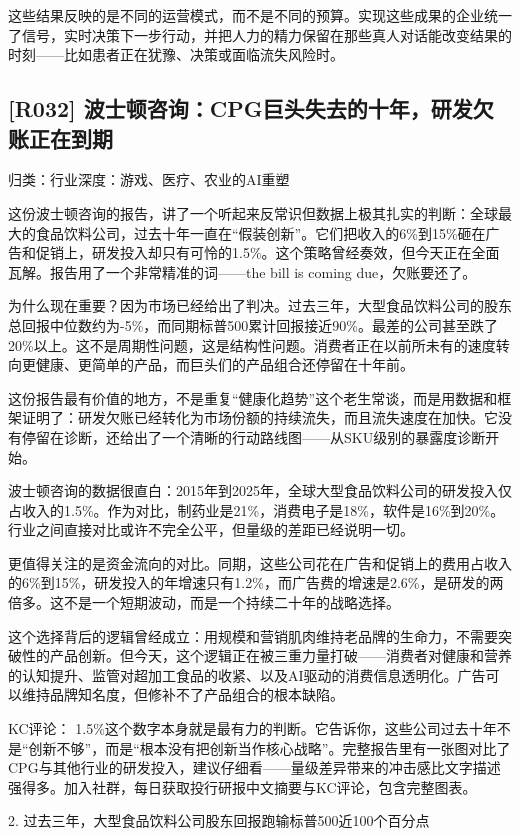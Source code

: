 \documentclass[11pt]{ctexart}
\begin{document}
这些结果反映的是不同的运营模式，而不是不同的预算。实现这些成果的企业统一了信号，实时决策下一步行动，并把人力的精力保留在那些真人对话能改变结果的时刻——比如患者正在犹豫、决策或面临流失风险时。

\subsection{[R032] 波士顿咨询：CPG巨头失去的十年，研发欠账正在到期}
{\small\color{refgray}归类：行业深度：游戏、医疗、农业的AI重塑}

这份波士顿咨询的报告，讲了一个听起来反常识但数据上极其扎实的判断：全球最大的食品饮料公司，过去十年一直在“假装创新”。它们把收入的6\%到15\%砸在广告和促销上，研发投入却只有可怜的1.5\%。这个策略曾经奏效，但今天正在全面瓦解。报告用了一个非常精准的词——the bill is coming due，欠账要还了。

为什么现在重要？因为市场已经给出了判决。过去三年，大型食品饮料公司的股东总回报中位数约为-5\%，而同期标普500累计回报接近90\%。最差的公司甚至跌了20\%以上。这不是周期性问题，这是结构性问题。消费者正在以前所未有的速度转向更健康、更简单的产品，而巨头们的产品组合还停留在十年前。

这份报告最有价值的地方，不是重复“健康化趋势”这个老生常谈，而是用数据和框架证明了：研发欠账已经转化为市场份额的持续流失，而且流失速度在加快。它没有停留在诊断，还给出了一个清晰的行动路线图——从SKU级别的暴露度诊断开始。

波士顿咨询的数据很直白：2015年到2025年，全球大型食品饮料公司的研发投入仅占收入的1.5\%。作为对比，制药业是21\%，消费电子是18\%，软件是16\%到20\%。行业之间直接对比或许不完全公平，但量级的差距已经说明一切。

更值得关注的是资金流向的对比。同期，这些公司花在广告和促销上的费用占收入的6\%到15\%，研发投入的年增速只有1.2\%，而广告费的增速是2.6\%，是研发的两倍多。这不是一个短期波动，而是一个持续二十年的战略选择。

这个选择背后的逻辑曾经成立：用规模和营销肌肉维持老品牌的生命力，不需要突破性的产品创新。但今天，这个逻辑正在被三重力量打破——消费者对健康和营养的认知提升、监管对超加工食品的收紧、以及AI驱动的消费信息透明化。广告可以维持品牌知名度，但修补不了产品组合的根本缺陷。

KC评论： 1.5\%这个数字本身就是最有力的判断。它告诉你，这些公司过去十年不是“创新不够”，而是“根本没有把创新当作核心战略”。完整报告里有一张图对比了CPG与其他行业的研发投入，建议仔细看——量级差异带来的冲击感比文字描述强得多。加入社群，每日获取投行研报中文摘要与KC评论，包含完整图表。

2. 过去三年，大型食品饮料公司股东回报跑输标普500近100个百分点
\end{document}

